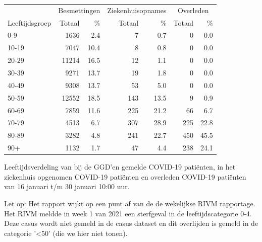 \documentclass[
  english,
  man,floatsintext]{apa6}
\begin{document}
\begin{table}[H]
\centering\begingroup\fontsize{11}{13}\selectfont

\begin{threeparttable}
\begin{tabular}{lrrrrrr}
\toprule
\multicolumn{1}{c}{ } & \multicolumn{2}{c}{Besmettingen} & \multicolumn{2}{c}{Ziekenhuisopnames} & \multicolumn{2}{c}{Overleden} \\
\cmidrule(l{3pt}r{3pt}){2-3} \cmidrule(l{3pt}r{3pt}){4-5} \cmidrule(l{3pt}r{3pt}){6-7}
Leeftijdsgroep & Totaal & \% & Totaal & \% & Totaal & \%\\
\midrule
0-9 & 1636 & 2.4 & 7 & 0.7 & 0 & 0.0\\
10-19 & 7047 & 10.4 & 8 & 0.8 & 0 & 0.0\\
20-29 & 11214 & 16.5 & 12 & 1.1 & 0 & 0.0\\
30-39 & 9271 & 13.7 & 19 & 1.8 & 0 & 0.0\\
40-49 & 9308 & 13.7 & 53 & 5.0 & 0 & 0.0\\
50-59 & 12552 & 18.5 & 143 & 13.5 & 9 & 0.9\\
60-69 & 7859 & 11.6 & 225 & 21.2 & 66 & 6.7\\
70-79 & 4513 & 6.7 & 307 & 28.9 & 225 & 22.8\\
80-89 & 3282 & 4.8 & 241 & 22.7 & 450 & 45.5\\
90+ & 1132 & 1.7 & 47 & 4.4 & 238 & 24.1\\
\bottomrule
\end{tabular}
\begin{tablenotes}
\item[1] Leeftijdsverdeling van bij de GGD’en gemelde COVID-19 patiënten, in het ziekenhuis opgenomen COVID-19 patiënten en overleden COVID-19 patiënten van 16 januari t/m 30 januari 10:00 uur.
\item[2] Let op: Het rapport wijkt op een punt af van de de wekelijkse RIVM rapportage. Het RIVM meldde in week 1 van 2021 een sterfgeval in de leeftijdscategorie 0-4. Deze casus wordt niet gemeld in de casus dataset en dit overlijden is gemeld in de categorie '<50' (die we hier niet tonen).
\end{tablenotes}
\end{threeparttable}
\endgroup{}
\end{table}

\newpage
\end{document}
